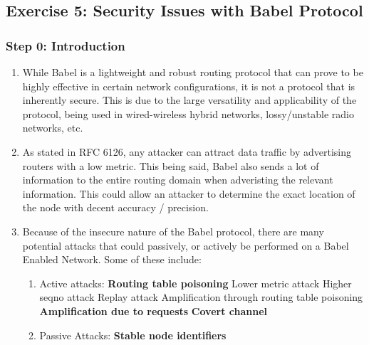 \documentclass[main.tex]{subfiles}
\begin{document}
\subsection{Exercise 5: Security Issues with Babel Protocol}
\begin{itemize}


\subsubsection{Step 0: Introduction}
\begin{enumerate}[noitemsep,label=$\bullet$,leftmargin=20mm,labelsep=0.5cm]

\item While Babel is a lightweight and robust routing protocol that can prove to be highly effective in certain network configurations, it is not a protocol that is inherently secure. This is due to the large versatility and applicability of the protocol, being used in wired-wireless hybrid networks, lossy/unstable radio networks, etc. 

\item As stated in RFC 6126, any attacker can attract data traffic by advertising routers with a low metric. This being said, Babel also sends a lot of information to the entire routing domain when adveristing the relevant information. This could allow an attacker to determine the exact location of the node with decent accuracy / precision. 


\item Because of the insecure nature of the Babel protocol, there are many potential attacks that could passively, or actively be performed on a Babel Enabled Network. Some of these include:

\begin{enumerate}
    \item Active attacks:
        \subitem \textbf{Routing table poisoning}
        \subsubitem Lower metric attack
        \subsubitem Higher seqno attack
        \subsubitem Replay attack
        \subsubitem Amplification through routing table poisoning
        \subitem \textbf{Amplification due to requests}
        \subitem \textbf{Covert channel}
    \item Passive Attacks:
        \subitem \textbf{Stable node identifiers}
\end{enumerate}



\end{enumerate}



\end{itemize}
\end{document}
